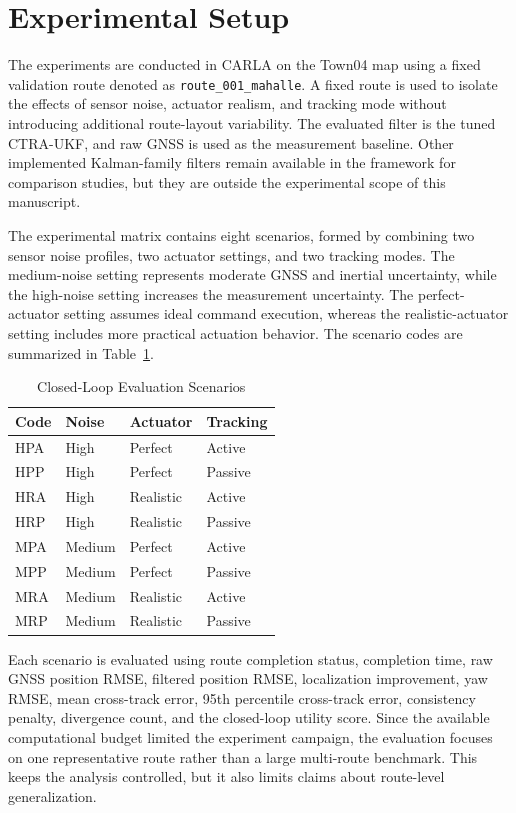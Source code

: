 \documentclass[conference]{IEEEtran}
\begin{document}
\section{Experimental Setup}
\label{sec:experimental_setup}

The experiments are conducted in CARLA on the Town04 map using a fixed validation route denoted as \texttt{route\_001\_mahalle}. A fixed route is used to isolate the effects of sensor noise, actuator realism, and tracking mode without introducing additional route-layout variability. The evaluated filter is the tuned CTRA-UKF, and raw GNSS is used as the measurement baseline. Other implemented Kalman-family filters remain available in the framework for comparison studies, but they are outside the experimental scope of this manuscript.

The experimental matrix contains eight scenarios, formed by combining two sensor noise profiles, two actuator settings, and two tracking modes. The medium-noise setting represents moderate GNSS and inertial uncertainty, while the high-noise setting increases the measurement uncertainty. The perfect-actuator setting assumes ideal command execution, whereas the realistic-actuator setting includes more practical actuation behavior. The scenario codes are summarized in Table~\ref{tab:scenarios}.

\begin{table}[!t]
\renewcommand{\arraystretch}{1.15}
\caption{Closed-Loop Evaluation Scenarios}
\label{tab:scenarios}
\centering
\begin{tabular}{@{}llll@{}}
\toprule
Code & Noise & Actuator & Tracking \\
\midrule
HPA & High & Perfect & Active \\
HPP & High & Perfect & Passive \\
HRA & High & Realistic & Active \\
HRP & High & Realistic & Passive \\
MPA & Medium & Perfect & Active \\
MPP & Medium & Perfect & Passive \\
MRA & Medium & Realistic & Active \\
MRP & Medium & Realistic & Passive \\
\bottomrule
\end{tabular}
\end{table}

Each scenario is evaluated using route completion status, completion time, raw GNSS position RMSE, filtered position RMSE, localization improvement, yaw RMSE, mean cross-track error, 95th percentile cross-track error, consistency penalty, divergence count, and the closed-loop utility score. Since the available computational budget limited the experiment campaign, the evaluation focuses on one representative route rather than a large multi-route benchmark. This keeps the analysis controlled, but it also limits claims about route-level generalization.
\end{document}

